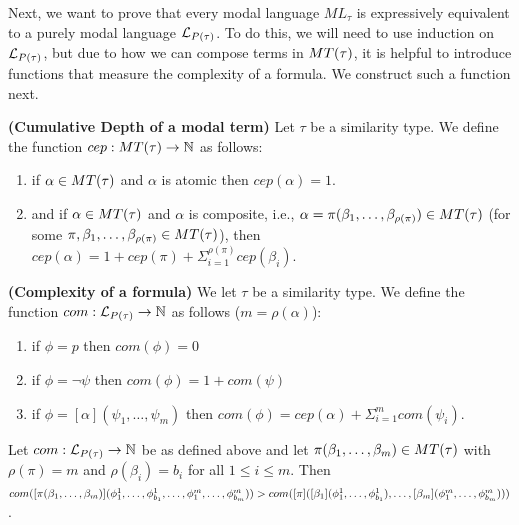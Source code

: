 \par Next, we want to prove that every modal language $ML_\tau$ is expressively equivalent to a purely modal language $\mathcal{L}_{P(\tau)}$. To do this, we will need to use induction on $\mathcal{L}_{P(\tau)}$, but due to how we can compose terms in $MT(\tau)$, it is helpful to introduce functions that measure the complexity of a formula. We construct such a function next.

\begin{definition}\label{cep of modal term def}
    \textbf{(Cumulative Depth of a modal term)} Let $\tau$ be a similarity type. We define the function $cep:MT(\tau)\to\mathbb{N}$ as follows:
    \begin{enumerate}
        \item if $\alpha\in MT(\tau)$ and $\alpha$ is atomic then $cep(\alpha)=1$.
        \item  and if $\alpha\in MT(\tau)$ and $\alpha$ is composite, i.e., $\alpha=\pi(\beta_1,\ldots,\beta_{\rho(\pi)})\in MT(\tau)$ (for some $\pi,\beta_1,\ldots,\beta_{\rho(\pi)}\in MT(\tau)$), then $cep(\alpha)=1 + cep(\pi) + \Sigma_{i=1}^{\rho(\pi)}cep(\beta_i)$.
    \end{enumerate}
\end{definition}

\begin{definition}\label{com of formula def}
    \textbf{(Complexity of a formula)} We let $\tau$ be a similarity type. We define the function $com: \mathcal{L}_{P(\tau)}\to \mathbb{N}$ as follows ($m=\rho(\alpha)$):
    \begin{enumerate}
        \item if $\phi = p$ then $com(\phi)=0$
        \item if $\phi = \neg\psi$ then $com(\phi) = 1 + com(\psi)$
        \item if $\phi = [\alpha](\psi_1,\ldots,\psi_{m})$ then $com(\phi) = cep(\alpha) + \Sigma_{i=1}^{m} com(\psi_i)$.
    \end{enumerate}
\end{definition}

\begin{lemma}\label{composed is higher com lemma}
    Let $com:\mathcal{L}_{P(\tau)}\to\mathbb{N}$ be as defined above and let $\pi(\beta_1,\ldots,\beta_m)\in MT(\tau)$ with $\rho(\pi) = m$ and $\rho(\beta_i) = b_i$ for all $1\leq i\leq m$. Then $com([\pi(\beta_1,\ldots,\beta_m)](\phi_1^1,\ldots,\phi_{b_1}^1,\ldots,\phi_1^m,\ldots,\phi_{b_m}^m))
    \\ > com([\pi]([\beta_1](\phi_1^1,\ldots,\phi_{b_1}^1),\ldots,[\beta_m](\phi_1^m,\ldots,\phi_{b_m}^m)))$.
\end{lemma}
    
